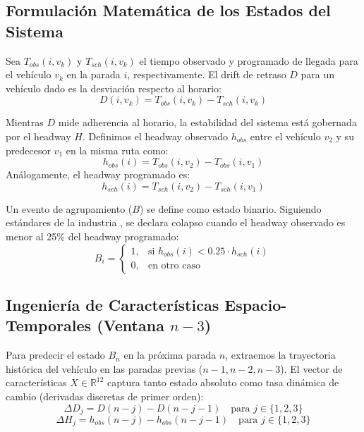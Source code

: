\documentclass[journal,twocolumn]{IEEEtran}
\begin{document}
\subsection{Formulación Matemática de los Estados del Sistema}
Sea $T_{obs}(i, v_k)$ y $T_{sch}(i, v_k)$ el tiempo observado y programado de llegada para el vehículo $v_k$ en la parada $i$, respectivamente. El drift de retraso $D$ para un vehículo dado es la desviación respecto al horario:
\begin{equation}
	D(i, v_k) = T_{obs}(i, v_k) - T_{sch}(i, v_k)
\end{equation}

Mientras $D$ mide adherencia al horario, la estabilidad del sistema está gobernada por el headway $H$. Definimos el headway observado $h_{obs}$ entre el vehículo $v_2$ y su predecesor $v_1$ en la misma ruta como:
\begin{equation}
	h_{obs}(i) = T_{obs}(i, v_2) - T_{obs}(i, v_1)
\end{equation}
Análogamente, el headway programado es:
\begin{equation}
	h_{sch}(i) = T_{sch}(i, v_2) - T_{sch}(i, v_1)
\end{equation}

Un evento de agrupamiento ($B$) se define como estado binario. Siguiendo estándares de la industria \cite{1,10}, se declara colapso cuando el headway observado es menor al 25\% del headway programado:
\begin{equation}
	B_i =
	\begin{cases}
		1, & \text{si } h_{obs}(i) < 0.25 \cdot h_{sch}(i) \\
		0, & \text{en otro caso}
	\end{cases}
\end{equation}

\subsection{Ingeniería de Características Espacio-Temporales (Ventana $n-3$)}
Para predecir el estado $B_n$ en la próxima parada $n$, extraemos la trayectoria histórica del vehículo en las paradas previas ($n-1, n-2, n-3$). El vector de características $X \in \mathbb{R}^{12}$ captura tanto estado absoluto como tasa dinámica de cambio (derivadas discretas de primer orden):
\begin{equation}
	\Delta D_j = D(n-j) - D(n-j-1) \quad \text{para } j \in \{1, 2, 3\}
\end{equation}
\begin{equation}
	\Delta H_j = h_{obs}(n-j) - h_{obs}(n-j-1) \quad \text{para } j \in \{1, 2, 3\}
\end{equation}
\end{document}

